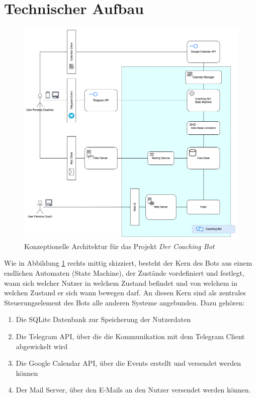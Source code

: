 \section{Technischer Aufbau}

	\begin{figure} %
		\centering
		\includegraphics[width=1.0\textwidth]{images/220320_PA28464_Architecture.png}
		\caption{Konzeptionelle Architektur für das Projekt \emph{Der Coaching Bot}}
		\label{fig: architecture}
	\end{figure}

	Wie in Abbildung \ref{fig: architecture} rechts mittig skizziert, besteht der Kern des Bots aus einem endlichen Automaten (State Machine), der Zustände vordefiniert und festlegt, wann sich welcher Nutzer in welchem Zustand befindet und von welchem in welchen Zustand er sich wann bewegen darf. An diesen Kern sind als zentrales Steuerungselement des Bots alle anderen Systeme angebunden. Dazu gehören:
	\begin{enumerate}
		\item Die SQLite Datenbank zur Speicherung der Nutzerdaten
		\item Die Telegram API, über die die Kommunikation mit dem Telegram Client abgewickelt wird
		\item Die Google Calendar API, über die Events erstellt und versendet werden können
		\item Der Mail Server, über den E-Mails an den Nutzer versendet werden können.
	\end{enumerate} 
 
